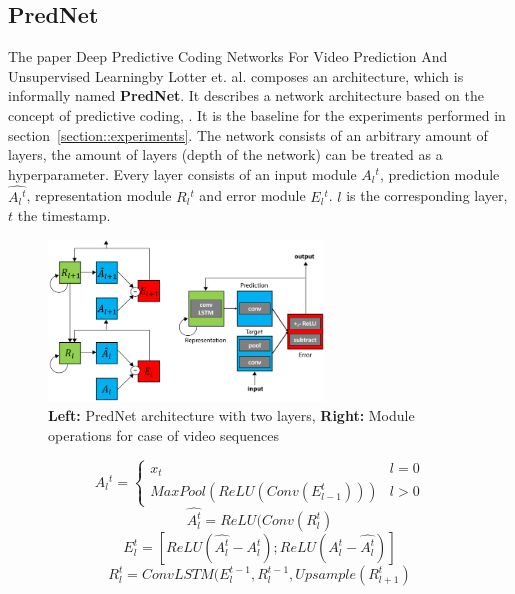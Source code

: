  \subsection{PredNet}
  The paper \glqq Deep Predictive Coding Networks For Video Prediction And Unsupervised Learning\grqq by Lotter et. al. \cite{Lotter2016} composes an architecture, which is informally named
  \textbf{PredNet}. It describes a network architecture based on the concept of \glqq predictive coding\grqq \cite{Rao1999}, \cite{Friston2005}. It is the baseline for the experiments performed
  in section~\ref{section::experiments}. The network consists of an arbitrary amount of layers, the amount of layers (depth of the network) can be treated as a hyperparameter. Every layer consists
  of an input module $A{_l}^t$, prediction module $\hat{A{_l}^t}$, representation module $R{_l}^t$ and error module $E{_l}^t$. $l$ is the corresponding layer, $t$ the timestamp.
  \begin{figure}[H]
   \includegraphics[width=0.65\textwidth]{../Images/lotter.png}
   \centering
   \caption{\textbf{Left:} PredNet architecture with two layers, \textbf{Right:} \glqq Module operations for case of video sequences\grqq \cite{Lotter2016}}
   \label{fig:lotter_architecture}
  \end{figure}
  \begin{equation}
   A{_l}^t = \begin{cases} x_t & l = 0 \\ MaxPool(ReLU(Conv(E_{l-1}^t))) & l > 0 \end{cases}
  \end{equation}
  \begin{equation}
   \hat{A_l^t} = ReLU(Conv(R_l^t)
  \end{equation}
  \begin{equation}
   E_l^t = [ReLU(\hat{A_l^t} - A_l^t); ReLU(A_l^t - \hat{A_l^t})]
  \end{equation}
  \begin{equation}
   R_l^t = ConvLSTM(E_l^{t-1}, R_l^{t-1}, Upsample(R_{l+1}^t)
  \end{equation}
 
